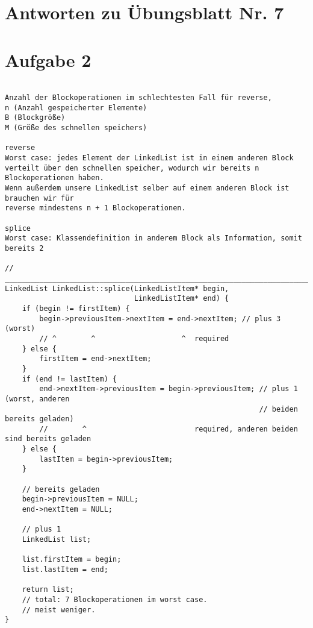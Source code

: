 \documentclass{scrartcl}
\begin{document}
\section*{Antworten zu Übungsblatt Nr. 7}

\section*{Aufgabe 2}

\begin{verbatim}

Anzahl der Blockoperationen im schlechtesten Fall für reverse, 
n (Anzahl gespeicherter Elemente)
B (Blockgröße)
M (Größe des schnellen speichers)

reverse
Worst case: jedes Element der LinkedList ist in einem anderen Block
verteilt über den schnellen speicher, wodurch wir bereits n Blockoperationen haben.
Wenn außerdem unsere LinkedList selber auf einem anderen Block ist brauchen wir für
reverse mindestens n + 1 Blockoperationen.

splice
Worst case: Klassendefinition in anderem Block als Information, somit bereits 2

// _____________________________________________________________________________
LinkedList LinkedList::splice(LinkedListItem* begin,
                              LinkedListItem* end) {
    if (begin != firstItem) {
        begin->previousItem->nextItem = end->nextItem; // plus 3 (worst)
        // ^        ^                    ^  required
    } else {
        firstItem = end->nextItem;
    }
    if (end != lastItem) {
        end->nextItem->previousItem = begin->previousItem; // plus 1 (worst, anderen
                                                           // beiden bereits geladen)
        //        ^                         required, anderen beiden sind bereits geladen
    } else {
        lastItem = begin->previousItem;
    }

    // bereits geladen
    begin->previousItem = NULL;
    end->nextItem = NULL;

    // plus 1
    LinkedList list;

    list.firstItem = begin;
    list.lastItem = end;

    return list;
    // total: 7 Blockoperationen im worst case.
    // meist weniger.
}

\end{verbatim}
\end{document}
